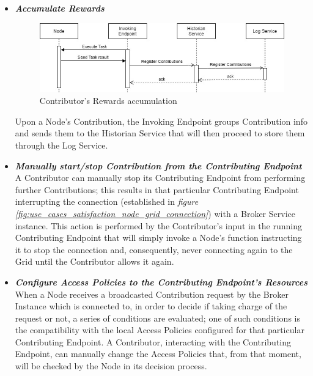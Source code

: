 \begin{itemize}
    \begin{itemize}
        \item \textbf{\textit{Accumulate Rewards}}\\
        \begin{figure}[!ht]
            \centering
            \includegraphics[scale=0.6]{document/chapters/chapter_6/images/use_cases_satisfaction_rewards_accumulation.jpg}
            \caption{Contributor's Rewards accumulation}
            \label{fig:use_cases_satisfaction_rewards_accumulation}
        \end{figure}

        Upon a Node's Contribution, the Invoking Endpoint groups Contribution info and sends them to the Historian Service that will then proceed to store them through the Log Service.

        \item \textbf{\textit{Manually start/stop Contribution from the Contributing Endpoint}}\\
        A Contributor can manually stop its Contributing Endpoint from performing further Contributions; this results in that particular Contributing Endpoint interrupting the connection (established in \textit{figure \ref{fig:use_cases_satisfaction_node_grid_connection}}) with a Broker Service instance.
        This action is performed by the Contributor's input in the running Contributing Endpoint that will simply invoke a Node's function instructing it to stop the connection and, consequently, never connecting again to the Grid until the Contributor allows it again.

        \item \textbf{\textit{Configure Access Policies to the Contributing Endpoint's Resources}}\\
        When a Node receives a broadcasted Contribution request by the Broker Instance which is connected to, in order to decide if taking charge of the request or not, a series of conditions are evaluated; one of such conditions is the compatibility with the local Access Policies configured for that particular Contributing Endpoint. 
        A Contributor, interacting with the Contributing Endpoint, can manually change the Access Policies that, from that moment, will be checked by the Node in its decision process. 


\end{itemize}
\end{itemize}
